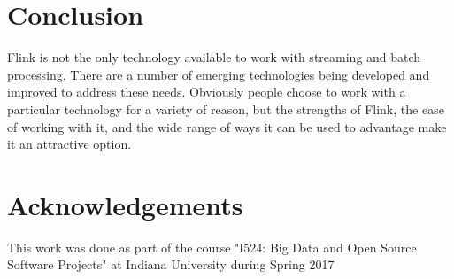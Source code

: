 \documentclass[9pt,twocolumn,twoside]{../../styles/osajnl}
\begin{document}
\section{Conclusion}
Flink is not the only technology available to work with streaming and batch processing. There are a number of emerging technologies being developed and improved to address these needs. Obviously people choose to work with a particular technology for a variety of reason, but the strengths of Flink, the ease of working with it, and the wide range of ways it can be used to advantage make it an attractive option.

\section{Acknowledgements}
This work was done as part of the course "I524: Big Data and Open Source Software Projects" at Indiana University during Spring 2017



 
\end{document}
